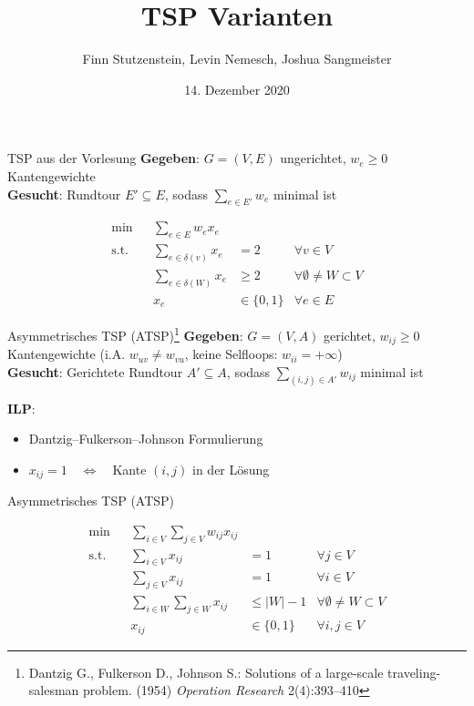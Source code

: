 \documentclass[ngerman,aspectratio=169,10pt]{beamer}
\title{TSP Varianten}
\date{14. Dezember 2020}
\author{Finn Stutzenstein, Levin Nemesch, Joshua Sangmeister}
\institute{Algorithm Engineering - Übung 3}
\begin{document}
\maketitle

\begin{frame}{TSP aus der Vorlesung}
	\textbf{Gegeben}: $G=(V,E)$ ungerichtet, $w_e\geq0$ Kantengewichte\\
	\textbf{Gesucht}: Rundtour $E'\subseteq E$, sodass $\sum_{e\in E'}w_e$ minimal ist
	
	\begin{align*}
	\min && \sum_{e\in E}w_ex_e&&\\
	\text{s.t.} && \sum_{e\in \delta(v)}x_e &=2 &\forall v\in V\\
	&& \sum_{e\in \delta(W)}x_e &\geq2 &\forall \emptyset\neq W\subset V\\
	&& x_e &\in\{0,1\} &\forall e\in E
	\end{align*}
\end{frame}

\begin{frame}{Asymmetrisches TSP (ATSP)\footnote{Dantzig G., Fulkerson D., Johnson S.: Solutions of a large-scale traveling-salesman problem. (1954) \emph{Operation Research} 2(4):393–410}}
	\textbf{Gegeben}: $G=(V,A)$ gerichtet, $w_{ij}\geq0$ Kantengewichte (i.A. $w_{uv}\neq w_{vu}$, keine Selfloops: $w_{ii}=+\infty$)\\
	\textbf{Gesucht}: Gerichtete Rundtour $A'\subseteq A$, sodass $\sum_{(i,j)\in A'}w_{ij}$ minimal ist
	
	\textbf{ILP}:
	\begin{itemize}
		\item Dantzig–Fulkerson–Johnson Formulierung
		\item $x_{ij}=1\quad\Leftrightarrow\quad$Kante $(i,j)$ in der Lösung
	\end{itemize}
\end{frame}
\begin{frame}{Asymmetrisches TSP (ATSP)}
	
	\begin{align*}
	\min && \sum_{i\in V}\sum_{j\in V}w_{ij}x_{ij}&&\\
	\text{s.t.} && \sum_{i\in V}x_{ij} &=1 &\forall j\in V\\
	&& \sum_{j\in V}x_{ij} &=1 &\forall i\in V\\
	&& \sum_{i\in W}\sum_{j\in W}x_{ij} &\leq|W|-1 &\forall \emptyset\neq W\subset V\\
	&& x_{ij} &\in\{0,1\} &\forall i,j\in V
	\end{align*}
\end{frame}
\end{document}

